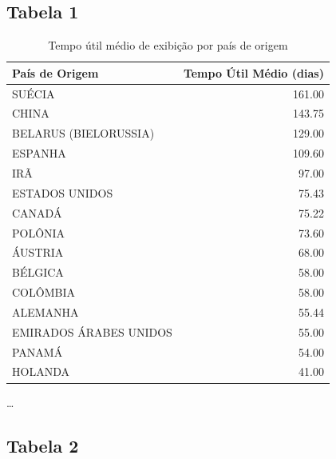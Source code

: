 \documentclass{article}
\begin{document}
\subsection*{Tabela 1}

\begin{table}[H]
\centering
\caption{Tempo útil médio de exibição por país de origem}
\begin{small}
\begin{tabular}{l r}
\hline
\textbf{País de Origem} & \textbf{Tempo Útil Médio (dias)} \\
\hline
SUÉCIA & 161.00 \\
CHINA & 143.75 \\
BELARUS (BIELORUSSIA) & 129.00 \\
ESPANHA & 109.60 \\
IRÃ & 97.00 \\
ESTADOS UNIDOS & 75.43 \\
CANADÁ & 75.22 \\
POLÔNIA & 73.60 \\
ÁUSTRIA & 68.00 \\
BÉLGICA & 58.00 \\
COLÔMBIA & 58.00 \\
ALEMANHA & 55.44 \\
EMIRADOS ÁRABES UNIDOS & 55.00 \\
PANAMÁ & 54.00 \\
HOLANDA & 41.00 \\
\end{tabular}
\end{small}

\begin{center}
\small
\ldots
\end{center}

\end{table}
 
\lipsum[1] %

\pagebreak
\subsection*{Tabela 2}
\end{document}
